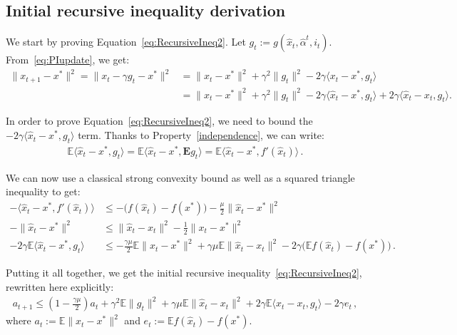 \documentclass[twoside]{article}
\newcommand{\stepsize}{\gamma}
\newcommand{\strongconvex}{\mu}
\newcommand{\E}{\mathbb{E}}
\newcommand{\Econd}{\mathbf{E}}
\begin{document}
\subsection{Initial recursive inequality derivation} \label{app:RecursiveDerivation}
\vspace{-1mm}
We start by proving Equation~\eqref{eq:RecursiveIneq2}.
Let $g_t := g(\hat x_t, \hat \alpha^t, i_t)$. From~\eqref{eq:PIupdate}, we get:
\begin{align*}
\|x_{t+1} - x^*\|^2 \nonumber
= \|x_t -\stepsize g_t -x^*\|^2 
&= \|x_t -x^*\|^2 + \stepsize^2 \|g_t\|^2 -2\stepsize\langle x_t -x^*,  g_t\rangle
\\
&= \|x_t -x^*\|^2 + \stepsize^2 \|g_t\|^2 
	- 2 \stepsize\langle \hat x_t -x^*,  g_t\rangle +2\stepsize\langle \hat x_t -x_t,  g_t\rangle .
\end{align*}

In order to prove Equation~\eqref{eq:RecursiveIneq2}, we need to bound the $- 2 \stepsize\langle \hat x_t -x^*,  g_t\rangle$ term.
Thanks to Property~\ref{independence}, we can write:
\vspace{-2mm}
\begin{align*}
\E \langle \hat x_t -x^*,  g_t\rangle 
= \E \langle \hat x_t -x^*, \Econd g_t \rangle
= \E \langle \hat x_t -x^*,  f'(\hat x_t)\rangle  \, .
\end{align*}

We can now use a classical strong convexity bound as well as a squared triangle inequality to get:
\begin{align}
- \langle \hat x_t -x^*,  f'(\hat x_t)\rangle &\leq - \big(f(\hat x_t) -f(x^*)\big) -\frac{\strongconvex}{2}\|\hat x_t - x^*\|^2
\tag*{(Strong convexity bound)} \nonumber \\
- \|\hat x_t - x^*\|^2 &\leq \|\hat x_t - x_t\|^2 - \frac{1}{2} \|x_t - x^*\|^2
\tag*{($\|a+b\|^2 \leq 2 \|a\|^2 + 2 \|b\|^2$)} \nonumber \\
- 2 \stepsize \E \langle \hat x_t -x^*,  g_t\rangle &\leq
	- \frac{\stepsize \strongconvex}{2} \E \|x_t - x^*\|^2
	+ \stepsize \strongconvex \E \|\hat x_t - x_t\|^2
	-2 \stepsize \big(\E f(\hat x_t) - f(x^*)\big)  \, .
\end{align}

Putting it all together, we get the initial recursive inequality~\eqref{eq:RecursiveIneq2}, rewritten here explicitly:
\begin{align}
a_{t+1} \leq 
	(1 -\frac{\stepsize \strongconvex}{2}) a_t 
	+ \stepsize^2 \E \|g_t\|^2 
	+ \stepsize\strongconvex \E\|\hat x_t - x_t\|^2 
	+ 2\stepsize \E \langle \hat x_t -x_t,  g_t\rangle
	-2\stepsize e_t  \, ,
\end{align}
where $a_t := \E \|x_t - x^*\|^2$ and $e_t := \E f(\hat x_t) - f(x^*)$.
\end{document}
